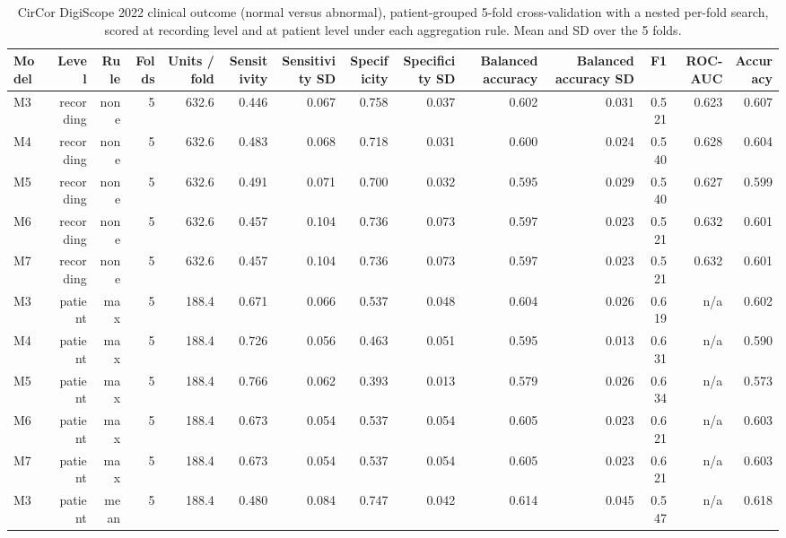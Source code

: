 \begin{table}[htbp]
  \centering
  \caption{CirCor DigiScope 2022 clinical outcome (normal versus abnormal), patient-grouped 5-fold cross-validation with a nested per-fold search, scored at recording level and at patient level under each aggregation rule. Mean and SD over the 5 folds.}
  \label{tab:t14}
  \begin{tabular}{lrrrrrrrrrrrrr}
    \toprule
    Model & Level & Rule & Folds & Units / fold & Sensitivity & Sensitivity SD & Specificity & Specificity SD & Balanced accuracy & Balanced accuracy SD & F1 & ROC-AUC & Accuracy \\
    \midrule
    M3 & recording & none & 5 & 632.6 & 0.446 & 0.067 & 0.758 & 0.037 & 0.602 & 0.031 & 0.521 & 0.623 & 0.607 \\
    M4 & recording & none & 5 & 632.6 & 0.483 & 0.068 & 0.718 & 0.031 & 0.600 & 0.024 & 0.540 & 0.628 & 0.604 \\
    M5 & recording & none & 5 & 632.6 & 0.491 & 0.071 & 0.700 & 0.032 & 0.595 & 0.029 & 0.540 & 0.627 & 0.599 \\
    M6 & recording & none & 5 & 632.6 & 0.457 & 0.104 & 0.736 & 0.073 & 0.597 & 0.023 & 0.521 & 0.632 & 0.601 \\
    M7 & recording & none & 5 & 632.6 & 0.457 & 0.104 & 0.736 & 0.073 & 0.597 & 0.023 & 0.521 & 0.632 & 0.601 \\
    M3 & patient & max & 5 & 188.4 & 0.671 & 0.066 & 0.537 & 0.048 & 0.604 & 0.026 & 0.619 & n/a & 0.602 \\
    M4 & patient & max & 5 & 188.4 & 0.726 & 0.056 & 0.463 & 0.051 & 0.595 & 0.013 & 0.631 & n/a & 0.590 \\
    M5 & patient & max & 5 & 188.4 & 0.766 & 0.062 & 0.393 & 0.013 & 0.579 & 0.026 & 0.634 & n/a & 0.573 \\
    M6 & patient & max & 5 & 188.4 & 0.673 & 0.054 & 0.537 & 0.054 & 0.605 & 0.023 & 0.621 & n/a & 0.603 \\
    M7 & patient & max & 5 & 188.4 & 0.673 & 0.054 & 0.537 & 0.054 & 0.605 & 0.023 & 0.621 & n/a & 0.603 \\
    M3 & patient & mean & 5 & 188.4 & 0.480 & 0.084 & 0.747 & 0.042 & 0.614 & 0.045 & 0.547 & n/a & 0.618 \\

\end{tabular}
\end{table}
